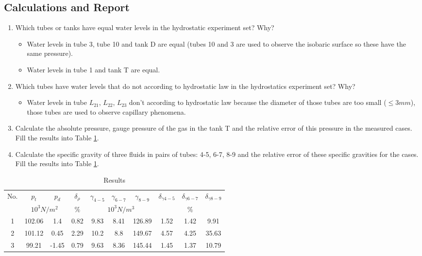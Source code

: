 \subsection{Calculations and Report}
\begin{enumerate}
	\item Which tubes or tanks have equal water levels in the hydrostatic experiment set? Why?\\
	\begin{itemize}[label=-]
		\item Water levels in tube 3, tube 10 and tank D are equal (tubes 10 and 3 are used to observe the isobaric surface so these have the same pressure).
		\item Water levels in tube 1 and tank T are equal.
	\end{itemize}
	\item Which tubes have water levels that do not according to hydrostatic law in the hydrostatics experiment set? Why?
	\begin{itemize}[label=-]
		\item Water levels in tube $L_{21}$, $L_{22}$, $L_{23}$ don’t according to hydrostatic law because the diameter of those tubes are too small ($\leq3mm$), those tubes are used to observe capillary phenomena.
	\end{itemize}
	\item Calculate the absolute pressure, gauge pressure of the gas in the tank T and the relative error of this pressure in the measured cases. Fill the results into Table \ref{tab3lab1}.
	\item Calculate the specific gravity of three fluids in pairs of tubes: 4-5, 6-7, 8-9 and the relative error of these specific gravities for the cases. Fill the results into Table \ref{tab3lab1}.
\end{enumerate}
\begin{table}[ht]
	\centering
	{\renewcommand{\arraystretch}{1.5}
	\begin{tabular}{|c|c|c|c|c|c|c|c|c|c|}
		\hline
		\multirow{2}{*}{No.} & $p_t$ & $p_d$ & $\delta_\rho$ & $\gamma_{4-5}$ & $\gamma_{6-7}$ & $\gamma_{8-9}$ & $\delta_{\gamma4-5}$ & $\delta_{\gamma6-7}$ & $\delta_{\gamma8-9}$ \\ \cline{2-10}
		& \multicolumn{2}{c|}{$10^3N/m^2$} & $\%$ & \multicolumn{3}{c|}{$10^3N/m^3$} & \multicolumn{3}{c|}{$\%$} \\ \hline
		1 & 102.06 & 1.4 & 0.82 & 9.83 & 8.41 & 126.89 & 1.52 & 1.42 & 9.91 \\ \hline
		2 & 101.12 & 0.45 & 2.29 & 10.2 & 8.8 & 149.67 & 4.57 & 4.25 & 35.63 \\ \hline
		3 & 99.21 & -1.45 & 0.79 & 9.63 & 8.36 & 145.44 & 1.45 & 1.37 & 10.79 \\ \hline
	\end{tabular}}
	\caption{Results}
	\label{tab3lab1}
\end{table}
